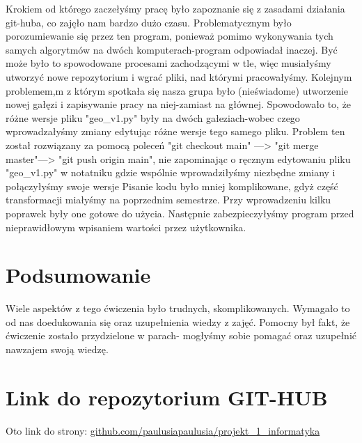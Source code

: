 \documentclass[10pt,a4paper]{article}
\begin{document}
Krokiem od którego zaczełyśmy pracę było zapoznanie się z zasadami działania git-huba, co zajęło nam bardzo dużo czasu. Problematycznym było porozumiewanie się przez ten program, ponieważ pomimo wykonywania tych samych algorytmów na dwóch komputerach-program odpowiadał inaczej. Być może było to spowodowane procesami zachodzącymi w tle, więc musiałyśmy utworzyć nowe repozytorium i wgrać pliki, nad którymi pracowałyśmy. Kolejnym problemem,m z którym spotkała się nasza grupa było (nieświadome) utworzenie nowej gałęzi i zapisywanie pracy na niej-zamiast na głównej. Spowodowało to, że różne wersje pliku "geo\_v1.py" były na dwóch gałeziach-wobec czego wprowadzałyśmy zmiany edytując różne wersje tego samego pliku.
Problem ten został rozwiązany za pomocą poleceń "git checkout main" ---> "git merge master"---> "git push origin main", nie zapominając o ręcznym edytowaniu pliku "geo\_v1.py" w notatniku gdzie wspólnie wprowadziłyśmy niezbędne zmiany i połączyłyśmy swoje wersje
Pisanie kodu było mniej komplikowane, gdyż część transformacji miałyśmy na poprzednim semestrze. Przy wprowadzeniu kilku poprawek były one gotowe do użycia. Następnie zabezpieczyłyśmy program przed nieprawidłowym wpisaniem wartości przez użytkownika.


\section{Podsumowanie}
Wiele aspektów z tego ćwiczenia było trudnych, skomplikowanych. Wymagało to od nas doedukowania się oraz uzupełnienia wiedzy z zajęć. Pomocny był fakt, że ćwiczenie zostało przydzielone w parach- mogłyśmy sobie pomagać oraz uzupełnić nawzajem swoją wiedzę. 
 

\section{Link do repozytorium GIT-HUB}
	Oto link do strony: \href{github.com/paulusiapaulusia/projekt_1_informatyka}{github.com/paulusiapaulusia/projekt\_1\_informatyka}

	
\end{document}

